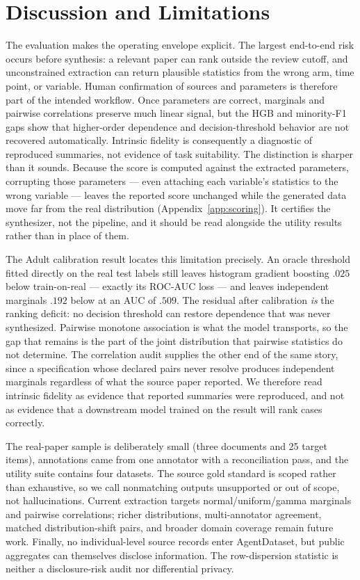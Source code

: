 \documentclass[letterpaper]{article} %
\begin{document}
\section{Discussion and Limitations}
The evaluation makes the operating envelope explicit. The largest end-to-end
risk occurs before synthesis: a relevant paper can rank outside the review
cutoff, and unconstrained extraction can return plausible statistics from the
wrong arm, time point, or variable. Human confirmation of sources and parameters
is therefore part of the intended workflow. Once parameters are correct,
marginals and pairwise correlations preserve much linear signal, but the HGB
and minority-F1 gaps show that higher-order dependence and decision-threshold
behavior are not recovered automatically. Intrinsic fidelity is consequently a
diagnostic of reproduced summaries, not evidence of task suitability. The
distinction is sharper than it sounds. Because the score is computed against the
extracted parameters, corrupting those parameters --- even attaching each
variable's statistics to the wrong variable --- leaves the reported score
unchanged while the generated data move far from the real distribution
(Appendix~\ref{app:scoring}). It certifies the synthesizer, not the pipeline,
and it should be read alongside the utility results rather than in place of them.

The Adult calibration result locates this limitation precisely. An oracle
threshold fitted directly on the real test labels still leaves histogram
gradient boosting $.025$ below train-on-real --- exactly its ROC-AUC loss ---
and leaves independent marginals $.192$ below at an AUC of $.509$. The residual
after calibration \emph{is} the ranking deficit: no decision threshold can
restore dependence that was never synthesized. Pairwise monotone association is
what the model transports, so the gap that remains is the part of the joint
distribution that pairwise statistics do not determine. The correlation audit
supplies the other end of the same story, since a specification whose declared
pairs never resolve produces independent marginals regardless of what the
source paper reported. We therefore read intrinsic fidelity as evidence that
reported summaries were reproduced, and not as evidence that a downstream model
trained on the result will rank cases correctly.

The real-paper sample is deliberately small (three documents and 25 target
items), annotations came from one annotator with a reconciliation pass, and the
utility suite contains four datasets. The source gold standard is scoped rather
than exhaustive, so we call nonmatching outputs unsupported or out of scope,
not hallucinations. Current extraction targets normal/uniform/gamma marginals
and pairwise correlations; richer distributions, multi-annotator agreement,
matched distribution-shift pairs, and broader domain coverage remain future
work. Finally, no individual-level source records enter AgentDataset, but public
aggregates can themselves disclose information. The row-dispersion statistic is
neither a disclosure-risk audit nor differential privacy.
\end{document}
